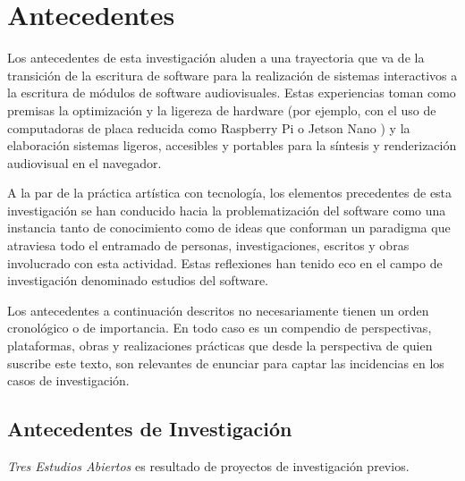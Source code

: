 \chapter{Antecedentes}



Los antecedentes de esta investigación aluden a una trayectoria que va de la transición de la escritura de software para la realización de sistemas interactivos a la escritura de módulos de software audiovisuales. Estas experiencias toman como premisas la optimización y la ligereza de hardware (por ejemplo, con el uso de computadoras de placa reducida como Raspberry Pi o Jetson Nano ) y la elaboración sistemas ligeros, accesibles y portables para la síntesis y renderización audiovisual en el navegador.

A la par de la práctica artística con tecnología, los elementos precedentes de esta investigación se han conducido hacia la problematización del software como una instancia tanto de conocimiento como de ideas que conforman un paradigma que atraviesa todo el entramado de personas, investigaciones, escritos y obras involucrado con esta actividad. Estas reflexiones han tenido eco en el campo de investigación denominado estudios del software.

Los antecedentes a continuación descritos no necesariamente tienen un orden cronológico o de importancia. En todo caso es un compendio de perspectivas, plataformas, obras y realizaciones prácticas que desde la perspectiva de quien suscribe este texto, son relevantes de enunciar para captar las incidencias en los casos de investigación. 

\section{Antecedentes de Investigación}

\textit{Tres Estudios Abiertos} es resultado de proyectos de investigación previos. 

